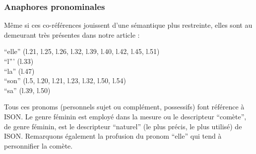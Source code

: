 \documentclass[a4paper,10pt]{article}
\begin{document}
		\subsubsection{Anaphores pronominales}
			Même si ces co-références jouissent d'une sémantique plus restreinte, elles sont au demeurant très présentes dans notre article :
			\begin{center}
				\footnotesize
				\begin{minipage}{0.7\textwidth}
					``elle'' (l.21, l.25, l.26, l.32, l.39, l.40, l.42, l.45, l.51)\\
					``l''' (l.33)\\
					``la'' (l.47)\\
					``son'' (l.5, l.20, l.21, l.23, l.32, l.50, l.54)\\
					``sa'' (l.39, l.50)
				\end{minipage}
			\end{center}
			Tous ces pronoms (personnels sujet ou complément, possessifs) font référence à ISON. Le genre féminin est employé dans la mesure ou le descripteur ``comète'', de genre féminin, est le descripteur ``naturel'' (le plus précis, le plus utilisé) de ISON. Remarquons également la profusion du pronom ``elle'' qui tend à personnifier la comète.
\end{document}
